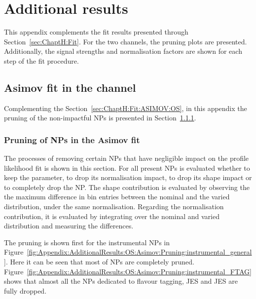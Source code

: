 \chapter{Additional results}
\label{chap:Appendix:AdditionalResults}
This appendix complements the fit results presented through Section~\ref{sec:ChaptH:Fit}.
For the two channels, the pruning plots are presented. Additionally, the signal strengths 
and normalisation factors are shown for each step of the fit procedure. 


\section{Asimov fit in the \dilepOStau channel}
\label{sec:Appendix:AdditionalResults:OS:Asimov}
Complementing the Section~\ref{sec:ChaptH:Fit:ASIMOV:OS}, in this appendix
the pruning of the non-impactful NPs is presented in Section~\ref{sec:Appendix:AdditionalResults:OS:Asimov:Pruning}.


\subsection{Pruning of NPs in the \dilepOStau Asimov fit}
\label{sec:Appendix:AdditionalResults:OS:Asimov:Pruning}
The processes of removing certain NPs that have negligible impact on the
 profile likelihood fit is shown in this section. 
For all present NPs is evaluated whether to keep the parameter, to drop
its normalisation impact, to drop its shape impact or to completely drop the
NP. The shape contribution is evaluated by observing the  the maximum difference 
in bin entries between the nominal and the varied distribution, under the same 
normalisation. Regarding the normalisation contribution, it is evaluated by
integrating over the nominal and varied distribution and measuring the differences.  

The pruning is shown first for the instrumental NPs in Figure~\ref{fig:Appendix:AdditionalResults:OS:Asimov:Pruning:instrumental_general}.
Here it can be seen that most of NPs are completely pruned. 
Figure~\ref{fig:Appendix:AdditionalResults:OS:Asimov:Pruning:instrumental_FTAG} shows that  almost 
all the NPs dedicated to flavour tagging, JES and JES are fully dropped. %

